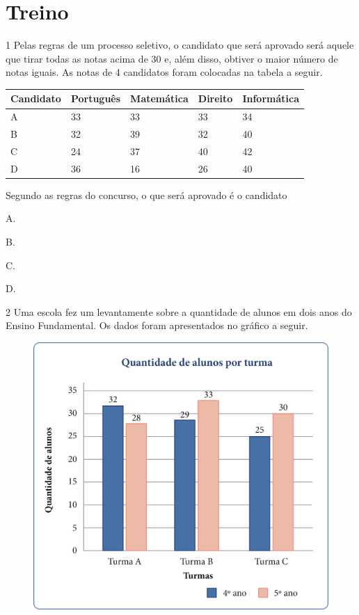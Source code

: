 \section*{Treino}

\num{1} Pelas regras de um processo seletivo, o candidato que será aprovado será
aquele que tirar todas as notas acima de 30 e, além disso, obtiver o maior
número de notas iguais. As notas de 4 candidatos foram colocadas na
tabela a seguir.

\begin{longtable}[]{@{}lllll@{}}
\toprule
Candidato & Português & Matemática & Direito &
Informática\tabularnewline
\midrule
\endhead
A & 33 & 33 & 33 & 34\tabularnewline
B & 32 & 39 & 32 & 40\tabularnewline
C & 24 & 37 & 40 & 42\tabularnewline
D & 36 & 16 & 26 & 40\tabularnewline
\bottomrule
\end{longtable}

Segundo as regras do concurso, o que será aprovado é o candidato

\begin{multicols}{2}
\begin{escolha}
\item
  A.
\item
  B.
\item
  C.
\item
  D.
\end{escolha}
\end{multicols}



\num{2} Uma escola fez um levantamente sobre a quantidade de alunos em dois anos
do Ensino Fundamental. Os dados foram apresentados no gráfico a seguir.

\begin{figure}[htpb!]
\centering
\includegraphics[width=.6\textwidth]{media/image50.png}
\end{figure}

